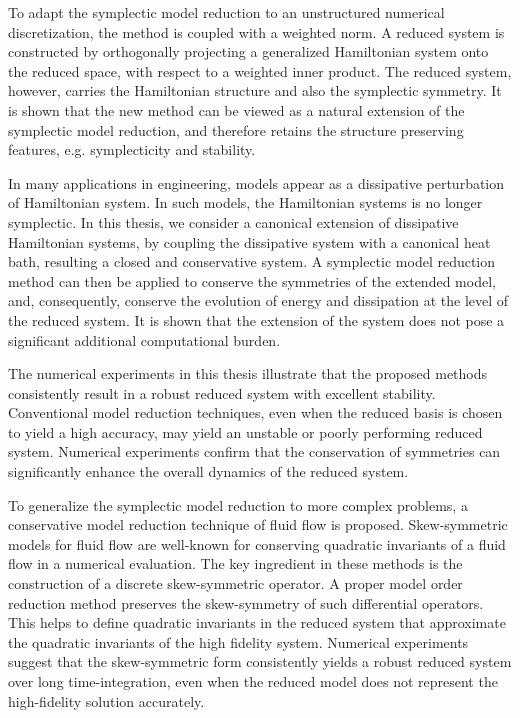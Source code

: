 To adapt the symplectic model reduction to an unstructured numerical discretization, the method is coupled with a weighted norm. A reduced system is constructed by orthogonally projecting a generalized Hamiltonian system onto the reduced space, with respect to a weighted inner product. The reduced system, however, carries the Hamiltonian structure and also the symplectic symmetry. It is shown that the new method can be viewed as a natural extension of the symplectic model reduction, and therefore retains the structure preserving features, e.g. symplecticity and stability.

In many applications in engineering, models appear as a dissipative perturbation of Hamiltonian system. In such models, the Hamiltonian systems is no longer symplectic. In this thesis, we consider a canonical extension of dissipative Hamiltonian systems, by coupling the dissipative system with a canonical heat bath, resulting a closed and conservative system. A symplectic model reduction method can then be applied to conserve the symmetries of the extended model, and, consequently, conserve the evolution of energy and dissipation at the level of the reduced system. It is shown that the extension of the system does not pose a significant additional computational burden.

The numerical experiments in this thesis illustrate that the proposed methods consistently result in a robust reduced system with excellent stability. Conventional model reduction techniques, even when the reduced basis is chosen to yield a high accuracy, may yield an unstable or poorly performing reduced system. Numerical experiments confirm that the conservation of symmetries can significantly enhance the overall dynamics of the reduced system.

To generalize the symplectic model reduction to more complex problems, a conservative model reduction technique of fluid flow is proposed. Skew-symmetric models for fluid flow are well-known for conserving quadratic invariants of a fluid flow in a numerical evaluation. The key ingredient in these methods is the construction of a discrete skew-symmetric operator. A proper model order reduction method preserves the skew-symmetry of such differential operators. This helps to define quadratic invariants in the reduced system that approximate the quadratic invariants of the high fidelity system. Numerical experiments suggest that the skew-symmetric form consistently yields a robust reduced system over long time-integration, even when the reduced model does not represent the high-fidelity solution accurately. 

